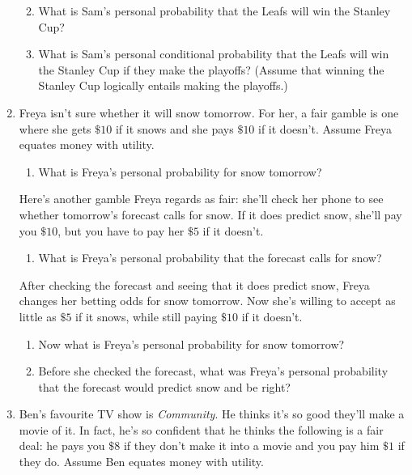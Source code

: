 \documentclass[justified]{tufte-book}
\providecommand{\tightlist}{%
  \setlength{\itemsep}{0pt}\setlength{\parskip}{0pt}}
\theoremstyle{definition}
\theoremstyle{definition}
\theoremstyle{definition}
\theoremstyle{definition}
\theoremstyle{remark}
\begin{document}
\begin{enumerate}
  \begin{enumerate}
  \def\labelenumii{\alph{enumii}.}
  \setcounter{enumii}{1}
  \tightlist
  \item
    What is Sam's personal probability that the Leafs will win the Stanley Cup?
  \item
    What is Sam's personal conditional probability that the Leafs will win the Stanley Cup if they make the playoffs? (Assume that winning the Stanley Cup logically entails making the playoffs.)
  \end{enumerate}
\item
  Freya isn't sure whether it will snow tomorrow. For her, a fair gamble is one where she gets \(\$10\) if it snows and she pays \(\$10\) if it doesn't. Assume Freya equates money with utility.

  \begin{enumerate}
  \def\labelenumii{\alph{enumii}.}
  \tightlist
  \item
    What is Freya's personal probability for snow tomorrow?
  \end{enumerate}

  Here's another gamble Freya regards as fair: she'll check her phone to see whether tomorrow's forecast calls for snow. If it does predict snow, she'll pay you \(\$10\), but you have to pay her \(\$5\) if it doesn't.

  \begin{enumerate}
  \def\labelenumii{\alph{enumii}.}
  \setcounter{enumii}{1}
  \tightlist
  \item
    What is Freya's personal probability that the forecast calls for snow?
  \end{enumerate}

  After checking the forecast and seeing that it does predict snow, Freya changes her betting odds for snow tomorrow. Now she's willing to accept as little as \(\$5\) if it snows, while still paying \(\$10\) if it doesn't.

  \begin{enumerate}
  \def\labelenumii{\alph{enumii}.}
  \setcounter{enumii}{2}
  \tightlist
  \item
    Now what is Freya's personal probability for snow tomorrow?
  \item
    Before she checked the forecast, what was Freya's personal probability that the forecast would predict snow and be right?
  \end{enumerate}
\item
  Ben's favourite TV show is \emph{Community}. He thinks it's so good they'll make a movie of it. In fact, he's so confident that he thinks the following is a fair deal: he pays you \(\$8\) if they don't make it into a movie and you pay him \(\$1\) if they do. Assume Ben equates money with utility.


\end{enumerate}
\end{document}
